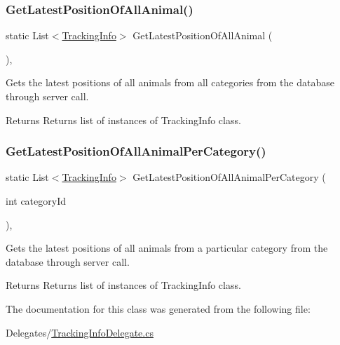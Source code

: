 \subsubsection{\texorpdfstring{Get\+Latest\+Position\+Of\+All\+Animal()}{GetLatestPositionOfAllAnimal()}}
{\footnotesize\ttfamily static List$<$\hyperlink{classWildlifeTrackingApp_1_1Models_1_1TrackingInfo}{Tracking\+Info}$>$ Get\+Latest\+Position\+Of\+All\+Animal (\begin{DoxyParamCaption}{ }\end{DoxyParamCaption})\hspace{0.3cm}{\ttfamily [inline]}, {\ttfamily [static]}}



Gets the latest positions of all animals from all categories from the database through server call. 

\begin{DoxyReturn}{Returns}
Returns list of instances of Tracking\+Info class.
\end{DoxyReturn}
\mbox{\label{classWildlifeTrackingApp_1_1Delegates_1_1TrackingInfoDelegate_a4ee9025a6305396144c0feff956de558}} 
\subsubsection{\texorpdfstring{Get\+Latest\+Position\+Of\+All\+Animal\+Per\+Category()}{GetLatestPositionOfAllAnimalPerCategory()}}
{\footnotesize\ttfamily static List$<$\hyperlink{classWildlifeTrackingApp_1_1Models_1_1TrackingInfo}{Tracking\+Info}$>$ Get\+Latest\+Position\+Of\+All\+Animal\+Per\+Category (\begin{DoxyParamCaption}\item[{int}]{category\+Id }\end{DoxyParamCaption})\hspace{0.3cm}{\ttfamily [inline]}, {\ttfamily [static]}}



Gets the latest positions of all animals from a particular category from the database through server call. 

\begin{DoxyReturn}{Returns}
Returns list of instances of Tracking\+Info class.
\end{DoxyReturn}


The documentation for this class was generated from the following file\+:\begin{DoxyCompactItemize}
\item 
Delegates/\hyperlink{TrackingInfoDelegate_8cs}{Tracking\+Info\+Delegate.\+cs}\end{DoxyCompactItemize}
